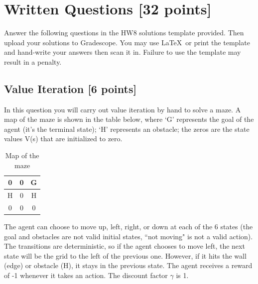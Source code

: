 \documentclass[11pt]{article}
\numberwithin{equation}{section} %
\numberwithin{figure}{section} %
\numberwithin{table}{section} %
\newcommand{\points}[1]{{\bf [#1 points]}}
\begin{document}
\section{Written Questions \points{32}}
\label{sec:warmup}
Answer the following questions in the HW8 solutions template provided.  Then upload your solutions to Gradescope. You may use \LaTeX\ or print the template and hand-write your answers then scan it in. Failure to use the template may result in a penalty.
\subsection{Value Iteration \points{6}}

In this question you will carry out value iteration by hand to solve a maze. A map of the maze is shown in the table below, where `G' represents the goal of the agent (it's the terminal state); `H' represents an obstacle; the zeros are the state values V(s) that are initialized to zero.

\begin{table}[H]
\begin{center}
  \begin{tabular}{ | c | c | c | }
    \hline
    0 & 0 & G\\ \hline
    H & 0 & H \\ \hline
    0 & 0 & 0 \\ \hline
  \end{tabular}
 \caption{Map of the maze}
\end{center}
\end{table}

The agent can choose to move up, left, right, or down at each of the 6 states (the goal and obstacles are not valid initial states, ``not moving" is not a valid action). The transitions are deterministic, so if the agent chooses to move left, the next state will be the grid to the left of the previous one. However, if it hits the wall (edge) or obstacle (H), it stays in the previous state. The agent receives a reward of -1 whenever it takes an action. The discount factor $\gamma$ is 1.
 
\end{document}
